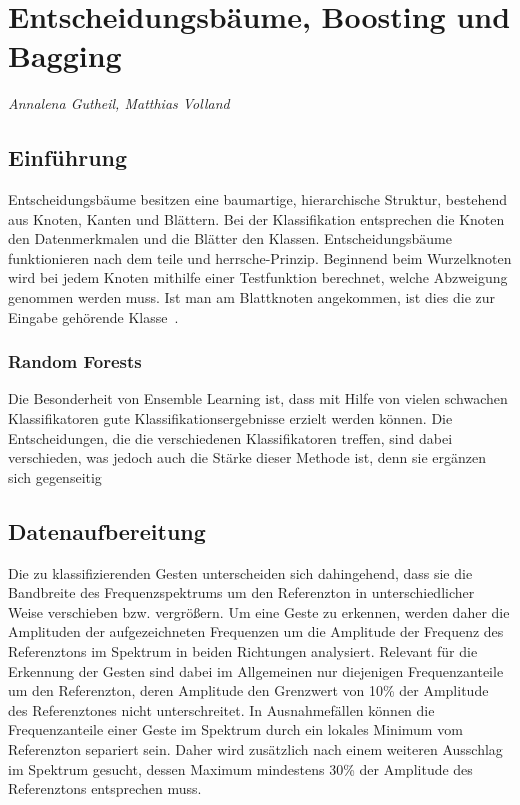 \section{Entscheidungsbäume, Boosting und Bagging}
\textit{Annalena Gutheil, Matthias Volland}

\subsection{Einführung}
Entscheidungsbäume besitzen eine baumartige, hierarchische Struktur, bestehend aus Knoten, Kanten und Blättern. 
Bei der Klassifikation entsprechen die Knoten den Datenmerkmalen und die Blätter den Klassen. 
Entscheidungsbäume funktionieren nach dem \glqq teile und herrsche\grqq -Prinzip. 
Beginnend beim Wurzelknoten wird bei jedem Knoten mithilfe einer Testfunktion berechnet, 
welche Abzweigung genommen werden muss. 
Ist man am Blattknoten angekommen, ist dies die zur Eingabe gehörende Klasse~\cite{alpaydin:maschinelles_lernen, borgelt:data_mining}.

\subsubsection*{Random Forests}

Die Besonderheit von Ensemble Learning ist, dass mit Hilfe von vielen schwachen Klassifikatoren 
gute Klassifikationsergebnisse erzielt werden können. 
Die Entscheidungen, die die verschiedenen Klassifikatoren treffen, sind dabei verschieden, 
was jedoch auch die Stärke dieser Methode ist, denn sie ergänzen sich gegenseitig

\subsection{Datenaufbereitung}

Die zu klassifizierenden Gesten unterscheiden sich dahingehend, dass sie die Bandbreite 
des Frequenzspektrums um den Referenzton in unterschiedlicher Weise verschieben bzw. vergrößern. 
Um eine Geste zu erkennen, werden daher die Amplituden der aufgezeichneten Frequenzen 
um die Amplitude der Frequenz des Referenztons im Spektrum in beiden Richtungen analysiert. 
Relevant für die Erkennung der Gesten sind dabei im Allgemeinen nur diejenigen Frequenzanteile 
um den Referenzton, deren Amplitude den Grenzwert von 10\% der Amplitude des Referenztones nicht unterschreitet. 
In Ausnahmefällen können die Frequenzanteile einer Geste im Spektrum durch ein lokales Minimum vom Referenzton 
separiert sein. Daher wird zusätzlich nach einem weiteren Ausschlag im Spektrum gesucht, 
dessen Maximum mindestens 30\% der Amplitude des Referenztons entsprechen muss.


